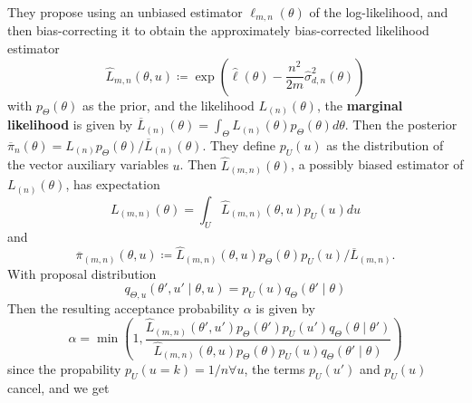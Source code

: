 They propose using an unbiased estimator $\ell_{m,n}\left(\theta\right)$ of the log-likelihood, and then bias-correcting it to obtain the approximately bias-corrected likelihood estimator
\begin{equation}
   \hat{L}_{m,n}\left(\theta, u\right) \coloneqq \exp\left(\hat{\ell}\left(\theta\right) - \frac{n^2}{2m}\hat{\sigma}_{d,n}^2\left(\theta\right)\right)
\end{equation}
with $p_{\Theta}\left(\theta\right)$ as the prior, and the likelihood $L_{\left(n\right)}\left(\theta\right)$, the \textbf{marginal likelihood} is given by $\overline{L}_{\left(n\right)}\left(\theta\right) = \int_{\Theta} L_{\left(n\right)}\left(\theta\right)p_{\Theta}\left(\theta\right) d\theta$. 
Then the posterior $\overline{\pi}_n\left(\theta\right) = L_{\left(n\right)}p_{\Theta}\left(\theta\right)/\overline{L}_{\left(n\right)}\left(\theta\right)$. 
They define $p_U\left(u\right)$ as the distribution of the vector auxiliary variables $u$. 
Then $\hat{L}_{\left(m,n\right)}\left(\theta\right)$, a possibly biased estimator of $L_{\left(n\right)}\left(\theta\right)$, has expectation 
\begin{equation}
    L_{\left(m,n\right)}\left(\theta\right) = \int_U \hat{L}_{\left(m,n\right)}\left(\theta, u\right) p_U\left(u\right) du 
\end{equation}
and 
\begin{equation}
    \overline{\pi}_{\left(m,n\right)} \left(\theta, u\right) \coloneqq \hat{L}_{\left(m,n\right)}\left(\theta, u\right)p_{\Theta}\left(\theta\right)p_U\left(u\right)/\overline{L}_{\left(m,n\right)}.
\end{equation}
With proposal distribution
\begin{equation}
    q_{\Theta, u}\left(\theta', u'\mid \theta, u\right) = p_U\left(u\right)q_{\Theta}\left(\theta'\mid \theta\right)
\end{equation}
Then the resulting acceptance probability $\alpha$ is given by 
\begin{equation}
    \alpha = \min\left(1, \frac{\hat{L}_{\left(m,n\right)}\left(\theta', u'\right)p_{\Theta}\left(\theta'\right)p_U\left(u'\right)q_{\Theta}\left(\theta\mid \theta'\right)}{\hat{L}_{\left(m,n\right)}\left(\theta, u\right)p_{\Theta}\left(\theta\right)p_U\left(u\right)q_{\Theta}\left(\theta'\mid \theta\right)}\right)
\end{equation}
since the propability $p_U\left(u = k\right) = 1/n \forall u$, the terms $p_U\left(u'\right)$ and $p_U\left(u\right)$ cancel, and we get 
